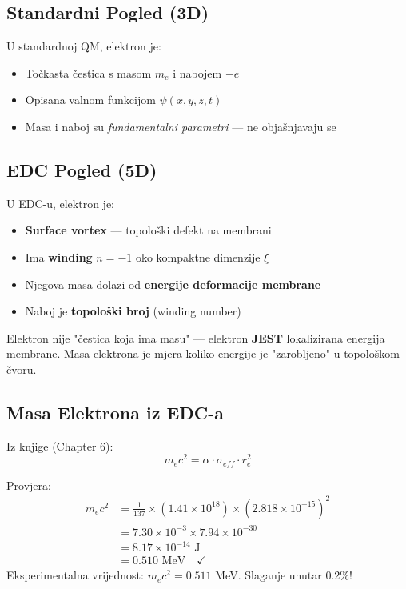 \documentclass[12pt,a4paper]{article}
\begin{document}
\subsection{Standardni Pogled (3D)}

U standardnoj QM, elektron je:
\begin{itemize}
    \item Točkasta čestica s masom $m_e$ i nabojem $-e$
    \item Opisana valnom funkcijom $\psi(x,y,z,t)$
    \item Masa i naboj su \textit{fundamentalni parametri} — ne objašnjavaju se
\end{itemize}

\subsection{EDC Pogled (5D)}

U EDC-u, elektron je:
\begin{itemize}
    \item \textbf{Surface vortex} — topološki defekt na membrani
    \item Ima \textbf{winding} $n = -1$ oko kompaktne dimenzije $\xi$
    \item Njegova masa dolazi od \textbf{energije deformacije membrane}
    \item Naboj je \textbf{topološki broj} (winding number)
\end{itemize}

\begin{insight}
Elektron nije "čestica koja ima masu" — elektron \textbf{JEST} lokalizirana energija membrane. Masa elektrona je mjera koliko energije je "zarobljeno" u topološkom čvoru.
\end{insight}

\subsection{Masa Elektrona iz EDC-a}

Iz knjige (Chapter 6):
\begin{equation}
\boxed{m_e c^2 = \alpha \cdot \sigma_{eff} \cdot r_e^2}
\end{equation}

\begin{numerical}
Provjera:
\begin{align*}
m_e c^2 &= \frac{1}{137} \times (1.41 \times 10^{18}) \times (2.818 \times 10^{-15})^2 \\
&= 7.30 \times 10^{-3} \times 7.94 \times 10^{-30} \\
&= 8.17 \times 10^{-14} \text{ J} \\
&= 0.510 \text{ MeV} \quad \checkmark
\end{align*}
Eksperimentalna vrijednost: $m_e c^2 = 0.511$ MeV. Slaganje unutar 0.2\%!
\end{numerical}
\end{document}
